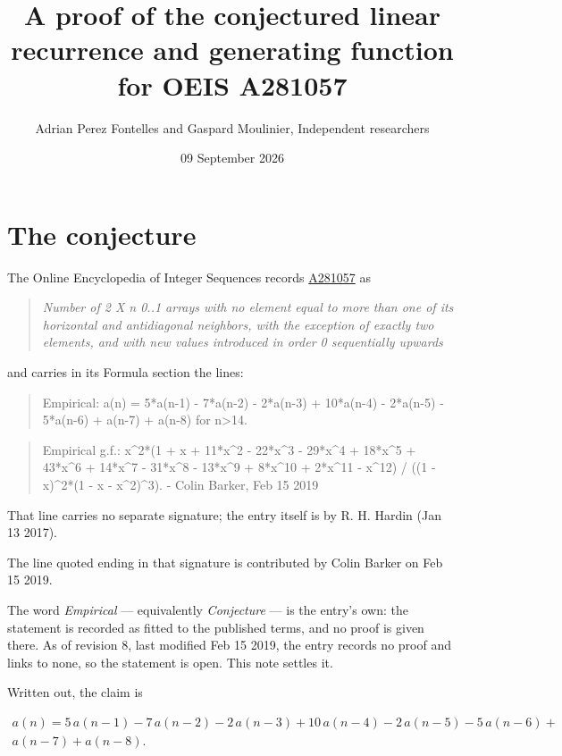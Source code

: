 \documentclass[11pt]{article}
\title{A proof of the conjectured linear recurrence and generating function for OEIS A281057}
\author{Adrian Perez Fontelles and Gaspard Moulinier, Independent researchers}
\date{09 September 2026}
\theoremstyle{definition}
\begin{document}
\maketitle
\section{The conjecture}

The Online Encyclopedia of Integer Sequences records \href{https://oeis.org/A281057}{A281057} as

\begin{quote}\itshape Number of 2 X n 0..1 arrays with no element equal to more than one of its horizontal and antidiagonal neighbors, with the exception of exactly two elements, and with new values introduced in order 0 sequentially upwards\end{quote}

and carries in its Formula section the lines:

\begin{quote}\ttfamily Empirical: a(n) = 5*a(n-1) - 7*a(n-2) - 2*a(n-3) + 10*a(n-4) - 2*a(n-5) - 5*a(n-6) + a(n-7) + a(n-8) for n>14.\end{quote}

\begin{quote}\ttfamily Empirical g.f.: x\textasciicircum{}2*(1 + x + 11*x\textasciicircum{}2 - 22*x\textasciicircum{}3 - 29*x\textasciicircum{}4 + 18*x\textasciicircum{}5 + 43*x\textasciicircum{}6 + 14*x\textasciicircum{}7 - 31*x\textasciicircum{}8 - 13*x\textasciicircum{}9 + 8*x\textasciicircum{}10 + 2*x\textasciicircum{}11 - x\textasciicircum{}12) / ((1 - x)\textasciicircum{}2*(1 - x - x\textasciicircum{}2)\textasciicircum{}3). - Colin Barker, Feb 15 2019\end{quote}

That line carries no separate signature; the entry itself is by R. H. Hardin (Jan 13 2017).

The line quoted ending in that signature is contributed by Colin Barker on Feb 15 2019.

The word {\itshape Empirical} --- equivalently {\itshape Conjecture} --- is the entry's own: the statement is recorded as fitted to the published terms, and no proof is given there. As of revision 8, last modified Feb 15 2019, the entry records no proof and links to none, so the statement is open. This note settles it.

Written out, the claim is

\begin{multline*} a(n) = 5\,a(n-1) - 7\,a(n-2) - 2\,a(n-3) + 10\,a(n-4) - 2\,a(n-5) - 5\,a(n-6) + \\ a(n-7) + a(n-8). \end{multline*}
\end{document}
